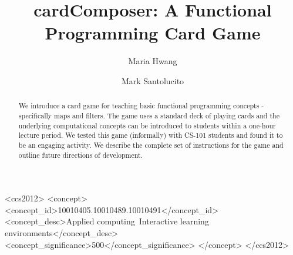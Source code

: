 \documentclass[sigconf]{acmart}
\begin{document}
\fancyhead{}
\title{cardComposer: A Functional Programming Card Game}


\author{Maria Hwang}

\author{Mark Santolucito}


\begin{abstract}
We introduce a card game for teaching basic functional programming concepts - specifically maps and filters.
The game uses a standard deck of playing cards and the underlying computational concepts can be introduced to students within a one-hour lecture period.
We tested this game (informally) with CS-101 students and found it to be an engaging activity.
We describe the complete set of instructions for the game and outline future directions of development. 
\end{abstract}



\begin{CCSXML}
<ccs2012>
   <concept>
       <concept_id>10010405.10010489.10010491</concept_id>
       <concept_desc>Applied computing~Interactive learning environments</concept_desc>
       <concept_significance>500</concept_significance>
       </concept>
 </ccs2012>
\end{CCSXML}





\maketitle
\end{document}
